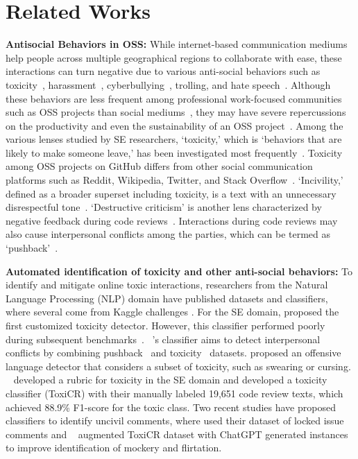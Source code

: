 \section{Related Works}
\label{sec:background}
\textbf{Antisocial Behaviors in OSS:} While internet-based communication mediums help people across multiple geographical regions to collaborate with ease, these interactions can turn negative due to various anti-social behaviors such as toxicity~\cite{bhat2021say}, harassment~\cite{lindsay2016experiences}, cyberbullying~\cite{kowalski2014bullying}, trolling, and hate speech~\cite{del2017hate, gagliardone2015countering}.
Although these behaviors are less frequent among professional work-focused communities such as OSS projects than social mediums~\cite{miller2022did}, they may have severe repercussions on the productivity and even the sustainability of an OSS project~\cite{raman2020stress,toxic-open-source-maintainer,perl-toxicity}.
Among the various lenses studied by SE researchers, 
`toxicity,' which is `behaviors that are likely to make someone leave,' has been investigated most frequently~\cite{raman2020stress, sarker2020benchmark, sarker2022automated, qiu2022detecting}. Toxicity among OSS projects on GitHub differs from other social communication platforms 
such as Reddit, Wikipedia, Twitter, and Stack Overflow~\cite{miller2022did}. 
`Incivility,' defined as a broader superset including toxicity, is a text with an unnecessary disrespectful tone~\cite{ferreira2021shut}.
`Destructive criticism'  is another lens characterized by negative feedback during code reviews~\cite{gunawardena2022destructive}. Interactions during code reviews may also cause interpersonal conflicts among the parties, which can be termed as `pushback'~\cite{murphy2022pushback, egelman2020predicting}. 

\vspace{3pt}
\noindent \textbf{Automated identification of toxicity and other anti-social behaviors:}
To identify and mitigate online toxic interactions, researchers from the Natural Language Processing (NLP) domain have published datasets and classifiers, where several come from Kaggle challenges \cite{zaheri2020toxic,bhat2021say,kumar2021designing,zhao2021comparative}. For the SE domain,  \citet{raman2020stress} proposed the first customized toxicity detector. However, this classifier performed poorly during subsequent benchmarks~\cite{sarker2020benchmark, miller2022did, qiu2022detecting}. ~\citet{qiu2022detecting}'s classifier aims to detect interpersonal conflicts by combining pushback~\cite{egelman2020predicting} and toxicity~\cite{raman2020stress} datasets. 
\citet{cheriyan2021towards} proposed an offensive language detector that considers a subset of toxicity, such as swearing or cursing. ~\citet{sarker2022automated} developed a rubric for toxicity in the SE domain and developed a toxicity classifier (ToxiCR) with their manually labeled 19,651 code review texts, which achieved 88.9\% F1-score for the toxic class. Two recent studies have proposed classifiers to identify uncivil comments, where \citet{ferreira2024incivility} used their dataset of locked issue comments and ~\citet{rahman2024words} augmented ToxiCR dataset with ChatGPT generated instances to improve identification of mockery and flirtation.


